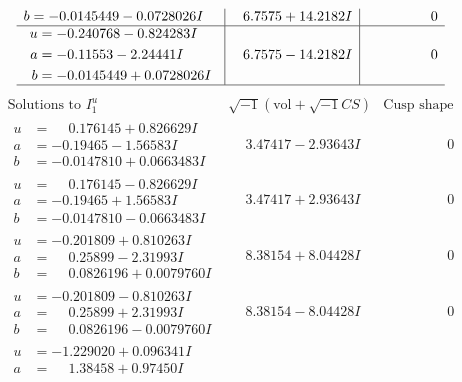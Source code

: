 \documentclass[1p]{elsarticle_modified}
\theoremstyle{definition}
\newcommand{\I}{\sqrt{-1}}
\begin{document}
$$\begin{array}{c|c|c}
\begin{aligned}
b &= -0.0145449 - 0.0728026 I\end{aligned}
 & \phantom{-}6.7575 + 14.2182 I & \phantom{-0.000000 } 0 \\ \hline\begin{aligned}
u &= -0.240768 - 0.824283 I \\
a &= -0.11553 - 2.24441 I \\
b &= -0.0145449 + 0.0728026 I\end{aligned}
 & \phantom{-}6.7575 - 14.2182 I & \phantom{-0.000000 } 0\\
 \hline 
 \end{array}$$\newpage$$\begin{array}{c|c|c}  
\text{Solutions to }I^u_{1}& \I (\text{vol} + \sqrt{-1}CS) & \text{Cusp shape}\\
 \hline 
\begin{aligned}
u &= \phantom{-}0.176145 + 0.826629 I \\
a &= -0.19465 - 1.56583 I \\
b &= -0.0147810 + 0.0663483 I\end{aligned}
 & \phantom{-}3.47417 - 2.93643 I & \phantom{-0.000000 } 0 \\ \hline\begin{aligned}
u &= \phantom{-}0.176145 - 0.826629 I \\
a &= -0.19465 + 1.56583 I \\
b &= -0.0147810 - 0.0663483 I\end{aligned}
 & \phantom{-}3.47417 + 2.93643 I & \phantom{-0.000000 } 0 \\ \hline\begin{aligned}
u &= -0.201809 + 0.810263 I \\
a &= \phantom{-}0.25899 - 2.31993 I \\
b &= \phantom{-}0.0826196 + 0.0079760 I\end{aligned}
 & \phantom{-}8.38154 + 8.04428 I & \phantom{-0.000000 } 0 \\ \hline\begin{aligned}
u &= -0.201809 - 0.810263 I \\
a &= \phantom{-}0.25899 + 2.31993 I \\
b &= \phantom{-}0.0826196 - 0.0079760 I\end{aligned}
 & \phantom{-}8.38154 - 8.04428 I & \phantom{-0.000000 } 0 \\ \hline\begin{aligned}
u &= -1.229020 + 0.096341 I \\
a &= \phantom{-}1.38458 + 0.97450 I \\

\end{aligned}
\end{array}$$
\end{document}
